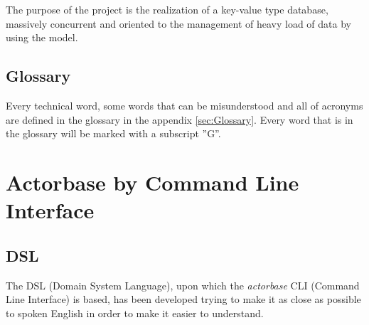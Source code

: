 \documentclass{scalatekids-article}
\begin{document}
The purpose of the project is the realization of a key-value type
 database,
massively concurrent and oriented to the management of heavy load of data by
using the  model.

\subsection{Glossary}
Every technical word, some words that can be misunderstood and all of acronyms are defined in the glossary in the appendix \ref{sec:Glossary}.
Every word that is in the glossary will be marked with a subscript ”G”.






\section{Actorbase by Command Line Interface}

\subsection{DSL}

The DSL (Domain System Language), upon which the \textit{actorbase} CLI (Command
Line Interface) is based, has been developed trying to make it as close as possible
to spoken English in order to make it easier to understand.
\end{document}
